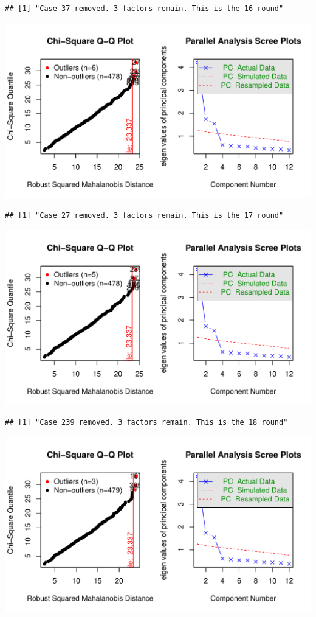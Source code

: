 \documentclass{article}\usepackage[]{graphicx}\usepackage[]{color}
\makeatletter
\def\maxwidth{ %
  \ifdim\Gin@nat@width>\linewidth
    \linewidth
  \else
    \Gin@nat@width
  \fi
}
\newenvironment{kframe}{%
 \def\at@end@of@kframe{}%
 \ifinner\ifhmode%
  \def\at@end@of@kframe{\end{minipage}}%
  \begin{minipage}{\columnwidth}%
 \fi\fi%
 \def\FrameCommand##1{\hskip\@totalleftmargin \hskip-\fboxsep
 \colorbox{shadecolor}{##1}\hskip-\fboxsep
     \hskip-\linewidth \hskip-\@totalleftmargin \hskip\columnwidth}%
 \MakeFramed {\advance\hsize-\width
   \@totalleftmargin\z@ \linewidth\hsize
   \@setminipage}}%
 {\par\unskip\endMakeFramed%
 \at@end@of@kframe}
\newenvironment{knitrout}{}{} %
\makeatother
\begin{document}
\begin{knitrout}
\begin{kframe}\begin{verbatim}
## [1] "Case 37 removed. 3 factors remain. This is the 16 round"
\end{verbatim}
\end{kframe}
\includegraphics[width=\maxwidth]{figure/unnamed-chunk-10-17} 
\begin{kframe}\begin{verbatim}
## [1] "Case 27 removed. 3 factors remain. This is the 17 round"
\end{verbatim}
\end{kframe}
\includegraphics[width=\maxwidth]{figure/unnamed-chunk-10-18} 
\begin{kframe}\begin{verbatim}
## [1] "Case 239 removed. 3 factors remain. This is the 18 round"
\end{verbatim}
\end{kframe}
\includegraphics[width=\maxwidth]{figure/unnamed-chunk-10-19} 

\end{knitrout}
\end{document}
